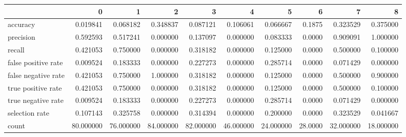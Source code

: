 \begin{tabular}{lrrrrrrrrr}
\toprule
{} &          0 &          1 &          2 &          3 &          4 &          5 &        6 &          7 &          8 \\
\midrule
accuracy            &   0.019841 &   0.068182 &   0.348837 &   0.087121 &   0.106061 &   0.066667 &   0.1875 &   0.323529 &   0.375000 \\
precision           &   0.592593 &   0.517241 &   0.000000 &   0.137097 &   0.000000 &   0.083333 &   0.0000 &   0.909091 &   1.000000 \\
recall              &   0.421053 &   0.750000 &   0.000000 &   0.318182 &   0.000000 &   0.125000 &   0.0000 &   0.500000 &   0.100000 \\
false positive rate &   0.009524 &   0.183333 &   0.000000 &   0.227273 &   0.000000 &   0.285714 &   0.0000 &   0.071429 &   0.000000 \\
false negative rate &   0.421053 &   0.750000 &   1.000000 &   0.318182 &   0.000000 &   0.125000 &   0.0000 &   0.500000 &   0.900000 \\
true positive rate  &   0.421053 &   0.750000 &   0.000000 &   0.318182 &   0.000000 &   0.125000 &   0.0000 &   0.500000 &   0.100000 \\
true negative rate  &   0.009524 &   0.183333 &   0.000000 &   0.227273 &   0.000000 &   0.285714 &   0.0000 &   0.071429 &   0.000000 \\
selection rate      &   0.107143 &   0.325758 &   0.000000 &   0.314394 &   0.000000 &   0.200000 &   0.0000 &   0.323529 &   0.041667 \\
count               &  80.000000 &  76.000000 &  84.000000 &  82.000000 &  46.000000 &  24.000000 &  28.0000 &  32.000000 &  18.000000 \\
\bottomrule
\end{tabular}
